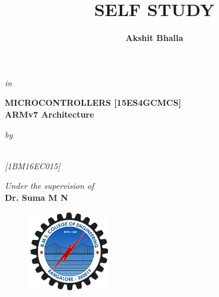 \title{\fontsize{14pt}{16.8pt}\selectfont\bf{SELF STUDY}}
\date{}

\maketitle
\thispagestyle{empty}

\begin{center}
\vspace*{-15mm}

{\fontsize{14pt}{16.8pt}\selectfont\textit{in}} \\
\vspace*{5mm}

{\fontsize{14pt}{16.8pt}\selectfont\textbf{MICROCONTROLLERS [15ES4GCMCS]}} \\

\vspace*{5mm}
{\fontsize{14pt}{16.8pt}\selectfont\textbf{ARMv7 Architecture}}

\vspace*{5mm}
{\fontsize{14pt}{16.8pt}\selectfont\textit{by}} \\
\vspace*{6mm}

\author{\fontsize{14pt}{16.8pt}\selectfont\textbf{Akshit Bhalla}}\\
\vspace*{2mm}
{\fontsize{12pt}{14.4pt}\selectfont\textit{[1BM16EC015]} } \\



\vspace*{3mm}

\vspace*{4mm}\fontsize{14pt}{16.8pt}\selectfont\textit{Under the supervision of} \\
\vspace*{2mm}\fontsize{14pt}{16.8pt}\selectfont\textbf{Dr. Suma M N} \\
\vspace*{8mm}

\begin{figure}[H]
\centering
  \includegraphics[height=36mm,width=36mm]{assets/BMSCE_Logo.png}
\end{figure}


\end{center}
